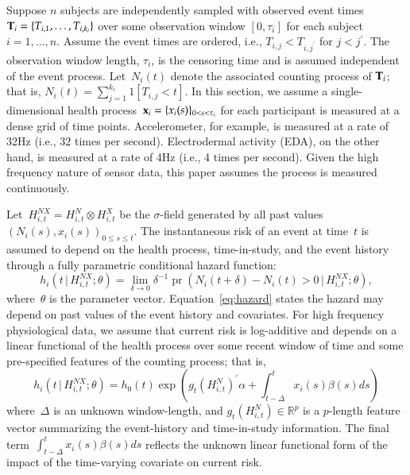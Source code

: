\documentclass[12pt]{amsart}
\def\pr{\mathop{\text{pr}}\nolimits}
\def\pr{\mathop{\text{pr}}\nolimits}
\def\given{\, | \,}
\def\Given{\, \big | \,}
\def\bfx{{\bf x}}
\def\bfT{{\bf T}}
\begin{document}
Suppose $n$ subjects are independently sampled with observed event
times~$\bfT_{i} = \{ T_{i,1}, \ldots, T_{i,k_i}\}$ over some observation
window $[0, \tau_i]$ for each subject $i = 1,\ldots, n$.  Assume the
event times are ordered, i.e., $T_{i,j} < T_{i,j^\prime}$ for $j <
j^\prime$. The observation window length, $\tau_i$, is the censoring
time and is assumed independent of the event process. Let~$N_{i} (t)$
denote the associated counting process of $\bfT_{i}$; that is, $N_i
(t) = \sum_{j=1}^{k_i} 1 [ T_{i,j} < t ]$.  
In this section, we assume a single-dimensional health process~$\bfx_i
= \{ x_i (s) \}_{0 < s < \tau_i}$ for each participant is measured at
a dense grid of time points.  Accelerometer, for example, is measured
at a rate of 32Hz (i.e., $32$ times per second). Electrodermal
activity (EDA), on the other hand, is measured at a rate of 4Hz (i.e.,
4 times per second).  Given the high frequency nature of sensor data,
this paper assumes the process is measured continuously.   

Let~$H_{i,t}^{NX} = H_{i,t}^{N} \otimes H_{i,t}^{X}$ be the $\sigma$-field
generated by all past values~$(N_i (s), x_i (s))_{0 \leq s \leq t}$.
The instantaneous risk of an event at time~$t$ is assumed to depend on
the health process, time-in-study, and the event history through a
fully parametric conditional hazard function:
\begin{equation}
\label{eq:hazard}
h_i \left( t \Given H_{i,t}^{NX} ; \theta \right) =
\lim_{\delta \to 0} \delta^{-1} \pr \left( N_i(t+\delta) - N_i(t) > 0
  \given H_{i,t}^{NX}; \theta \right), 
\end{equation}
where~$\theta$ is the parameter vector. Equation~\eqref{eq:hazard}
states the hazard may depend on past values of the event history and
covariates.  For high frequency physiological data, we assume that 
current risk is log-additive and depends on a linear functional of the
health process over some recent window of time and some pre-specified
features of the counting process; that is,  
\begin{equation}
\label{eq:hazardlinear}
h_i \left( t \given  H_{i,t}^{NX} ; \theta \right) = 
h_0 (t) \exp \left( g_t \left( H_{i,t}^{N} \right)^{\prime} \alpha
  + \int_{t-\Delta}^t x_i (s) \beta(s) ds  \right)
\end{equation}
where~$\Delta$ is an unknown window-length, and $g_t( H_{i,t}^N ) \in
\mathbb{R}^p$ is a $p$-length feature vector summarizing the
event-history and time-in-study information. The final
term~$\int_{t-\Delta}^t x_i(s) \beta(s) ds$ reflects the unknown
linear functional form of the impact of the time-varying covariate on
current risk.   
\end{document}
